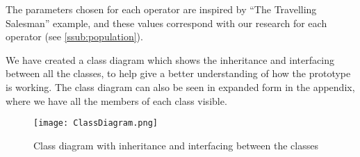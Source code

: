 The parameters chosen for each operator are inspired by “The Travelling Salesman” example, and these values correspond with our research for each operator (see \ref{ssub:population}).


We have created a class diagram which shows the inheritance and interfacing between all the classes, to help give a better understanding of how the prototype is working. The class diagram can also be seen in expanded form in the appendix, where we have all the members of each class visible.

\begin{figure}[!htbp]
	\centering
	\texttt{[image: ClassDiagram.png]}
	\caption{Class diagram with inheritance and interfacing between the classes}
	\label{fig:class}
\end{figure}

